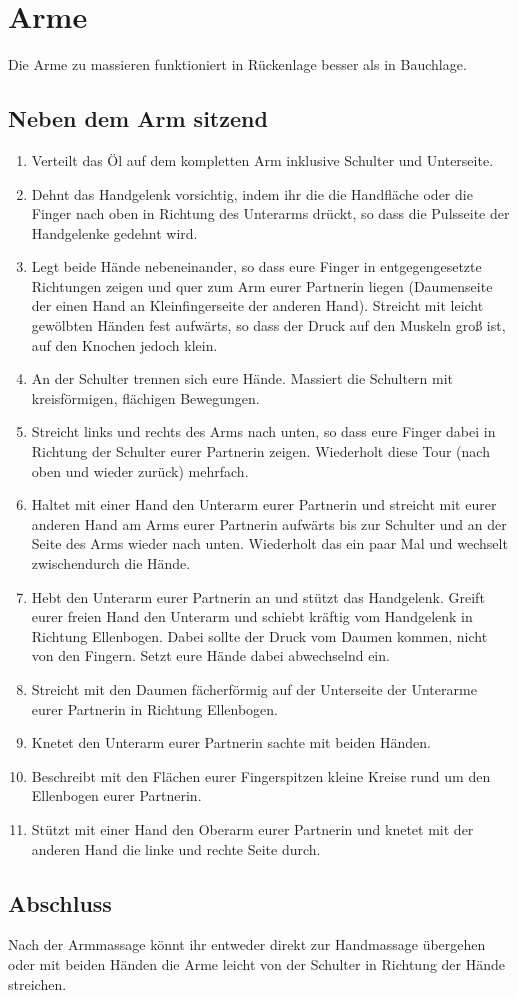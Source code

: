 \section{Arme}
Die Arme zu massieren funktioniert in Rückenlage besser als in Bauchlage.

\subsection{Neben dem Arm sitzend}

\begin{enumerate}
	\item {} Verteilt das Öl auf dem kompletten Arm inklusive Schulter und Unterseite.
	\item {} Dehnt das Handgelenk vorsichtig, indem ihr die die Handfläche oder die Finger nach oben in Richtung des Unterarms drückt, so dass die Pulsseite der Handgelenke gedehnt wird.
	\item {} Legt beide Hände nebeneinander, so dass eure Finger in entgegengesetzte Richtungen zeigen und quer zum Arm eurer Partnerin liegen (Daumenseite der einen Hand an Kleinfingerseite der anderen Hand). Streicht mit leicht gewölbten Händen fest aufwärts, so dass der Druck auf den Muskeln groß ist, auf den Knochen jedoch klein.
	\item {} An der Schulter trennen sich eure Hände. Massiert die Schultern mit kreisförmigen, flächigen Bewegungen.
	\item {} Streicht links und rechts des Arms nach unten, so dass eure Finger dabei in Richtung der Schulter eurer Partnerin zeigen. Wiederholt diese Tour (nach oben und wieder zurück) mehrfach.
	\item {} Haltet mit einer Hand den Unterarm eurer Partnerin und streicht mit eurer anderen Hand am Arms eurer Partnerin aufwärts bis zur Schulter und an der Seite des Arms wieder nach unten. Wiederholt das ein paar Mal und wechselt zwischendurch die Hände.
	\item {} Hebt den Unterarm eurer Partnerin an und stützt das Handgelenk. Greift eurer freien Hand den Unterarm und schiebt kräftig vom Handgelenk in Richtung Ellenbogen. Dabei sollte der Druck vom Daumen kommen, nicht von den Fingern. Setzt eure Hände dabei abwechselnd ein.
	\item {} Streicht mit den Daumen fächerförmig auf der Unterseite der Unterarme eurer Partnerin in Richtung Ellenbogen.
	\item {} Knetet den Unterarm eurer Partnerin sachte mit beiden Händen.
	\item {} Beschreibt mit den Flächen eurer Fingerspitzen kleine Kreise rund um den Ellenbogen eurer Partnerin.
	\item {} Stützt mit einer Hand den Oberarm eurer Partnerin und knetet mit der anderen Hand die linke und rechte Seite durch.
\end{enumerate}

\subsection{Abschluss}
Nach der Armmassage könnt ihr entweder direkt zur Handmassage übergehen oder mit beiden Händen die Arme leicht von der Schulter in Richtung der Hände streichen.
